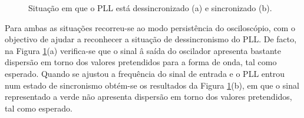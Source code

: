 \documentclass[11pt]{article}
\numberwithin{equation}{section}
\begin{document}
\begin{figure}[H]
	\centering
	\hspace{8mm}
	\vspace{-0.8em}
	\caption{Situação em que o PLL está dessincronizado (a) e sincronizado (b).}
	\label{fig:PLL}
	\vspace{-0.8em}
\end{figure}

Para ambas as situações recorreu-se ao modo persistência do osciloscópio, com o objectivo de ajudar a reconhecer a situação de dessincronismo do PLL. De facto, na Figura \ref{fig:PLL}(a) verifica-se que o sinal â saída do oscilador apresenta bastante dispersão em torno dos valores pretendidos para a forma de onda, tal como esperado. Quando se ajustou a frequência do sinal de entrada e o PLL entrou num estado de sincronismo obtém-se os resultados da Figura \ref{fig:PLL}(b), em que o sinal representado a verde não apresenta dispersão em torno dos valores pretendidos, tal como esperado.
\end{document}
